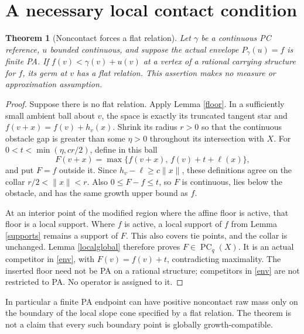 \documentclass[11pt]{article}
\newtheorem{theorem}{Theorem}
\newcommand{\PC}{\operatorname{PC}}
\begin{document}
\section{A necessary local contact condition}
\begin{theorem}[Noncontact forces a flat relation]\label{necessary}
Let \(\gamma\) be a continuous PC reference, \(u\) bounded continuous,
and suppose the actual envelope \(P_\gamma(u)=f\) is finite PA.
If \(f(v)<\gamma(v)+u(v)\) at a vertex of a rational carrying structure
for \(f\), its germ at \(v\) has a flat relation.
This assertion makes no measure or approximation assumption.
\end{theorem}
\begin{proof}
Suppose there is no flat relation. Apply Lemma \ref{floor}. In a
sufficiently small ambient ball about \(v\), the space is exactly its
truncated tangent star and \(f(v+x)=f(v)+h_v(x)\). Shrink its radius
\(r>0\) so that the continuous obstacle gap is greater than some
\(\eta>0\) throughout its intersection with \(X\).
For \(0<t<\min(\eta,cr/2)\), define in this ball
\[
 F(v+x)=\max\{f(v+x),\,f(v)+t+\ell(x)\},
\]
and put \(F=f\) outside it. Since \(h_v-\ell\geq c\|x\|\), these
definitions agree on the collar \(r/2<\|x\|<r\). Also
\(0\leq F-f\leq t\), so \(F\) is continuous, lies below the obstacle,
and has the same growth upper bound as \(f\).

At an interior point of the modified region where the affine floor is
active, that floor is a local support. Where \(f\) is active, a local
support of \(f\) from Lemma \ref{supports} remains a support of \(F\).
This also covers tie points, and the collar is unchanged. Lemma
\ref{localglobal} therefore proves \(F\in\PC_q(X)\).
It is an actual competitor in \eqref{env}, with \(F(v)=f(v)+t\),
contradicting maximality.
The inserted floor need not be PA on a rational structure; competitors
in \eqref{env} are not restricted to PA. No operator is assigned to it.
\end{proof}

In particular a finite PA endpoint can have positive noncontact raw mass
only on the boundary of the local slope cone specified by a flat
relation. The theorem is not a claim that every such boundary point
is globally growth-compatible.
\end{document}
